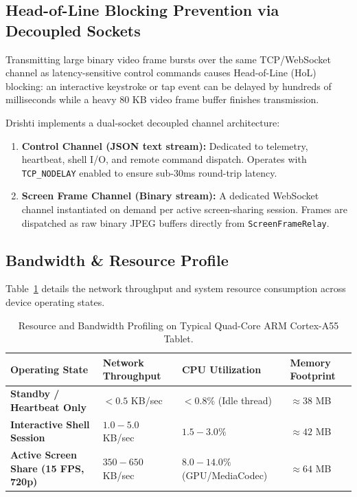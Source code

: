 \documentclass[11pt,a4paper]{article}
\begin{document}
\subsection{Head-of-Line Blocking Prevention via Decoupled Sockets}
Transmitting large binary video frame bursts over the same TCP/WebSocket channel as latency-sensitive control commands causes Head-of-Line (HoL) blocking: an interactive keystroke or tap event can be delayed by hundreds of milliseconds while a heavy 80 KB video frame buffer finishes transmission.

Drishti implements a dual-socket decoupled channel architecture:
\begin{enumerate}
    \item \textbf{Control Channel (JSON text stream):} Dedicated to telemetry, heartbeat, shell I/O, and remote command dispatch. Operates with \texttt{TCP\_NODELAY} enabled to ensure sub-30ms round-trip latency.
    \item \textbf{Screen Frame Channel (Binary stream):} A dedicated WebSocket channel instantiated on demand per active screen-sharing session. Frames are dispatched as raw binary JPEG buffers directly from \texttt{ScreenFrameRelay}.
\end{enumerate}

\subsection{Bandwidth \& Resource Profile}
Table~\ref{tab:bandwidth} details the network throughput and system resource consumption across device operating states.

\begin{table}[htbp]
\centering
\small
\begin{tabularx}{\textwidth}{l X X X}
\toprule
\textbf{Operating State} & \textbf{Network Throughput} & \textbf{CPU Utilization} & \textbf{Memory Footprint} \\
\midrule
\textbf{Standby / Heartbeat Only} & $< 0.5$ KB/sec & $< 0.8\%$ (Idle thread) & $\approx 38$ MB \\
\textbf{Interactive Shell Session} & $1.0 - 5.0$ KB/sec & $1.5 - 3.0\%$ & $\approx 42$ MB \\
\textbf{Active Screen Share (15 FPS, 720p)} & $350 - 650$ KB/sec & $8.0 - 14.0\%$ (GPU/MediaCodec) & $\approx 64$ MB \\
\bottomrule
\end{tabularx}
\caption{Resource and Bandwidth Profiling on Typical Quad-Core ARM Cortex-A55 Tablet.}
\label{tab:bandwidth}
\end{table}
\end{document}
